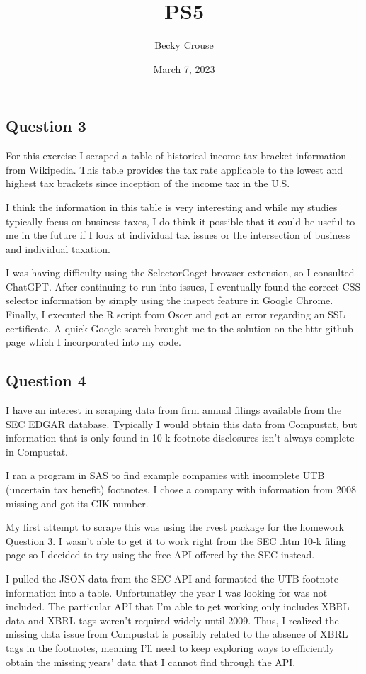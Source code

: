 \documentclass[nobib]{MSword}
\title{PS5}
\author{Becky Crouse}
\date{March 7, 2023}
\begin{document}
\maketitle

\subsection*{Question 3}
For this exercise I scraped a table of historical income tax bracket information from Wikipedia. This table provides the tax rate applicable to the lowest and highest tax brackets since inception of the income tax in the U.S. 

I think the information in this table is very interesting and while my studies typically focus on business taxes, I do think it possible that it could be useful to me in the future if I look at individual tax issues or the intersection of business and individual taxation.

I was having difficulty using the SelectorGaget browser extension, so I consulted ChatGPT. After continuing to run into issues, I eventually found the correct CSS selector information by simply using the inspect feature in Google Chrome. Finally, I executed the R script from Oscer and got an error regarding an SSL certificate. A quick Google search brought me to the solution on the httr github page which I incorporated into my code.

\subsection*{Question 4}
I have an interest in scraping data from firm annual filings available from the SEC EDGAR database. Typically I would obtain this data from Compustat, but information that is only found in 10-k footnote disclosures isn't always complete in Compustat. 

I ran a program in SAS to find example companies with incomplete UTB (uncertain tax benefit) footnotes. I chose a company with information from 2008 missing and got its CIK number.

My first attempt to scrape this was using the rvest package for the homework Question 3. I wasn't able to get it to work right from the SEC .htm 10-k filing page so I decided to try using the free API offered by the SEC instead.

 I pulled the JSON data from the SEC API and formatted the UTB footnote information into a table. Unfortunatley the year I was looking for was not included. The particular API that I'm able to get working only includes XBRL data and XBRL tags weren't required widely until 2009. Thus, I realized the missing data issue from Compustat is possibly related to the absence of XBRL tags in the footnotes, meaning I'll need to keep exploring ways to efficiently obtain the missing years' data that I cannot find through the API.
\end{document}
